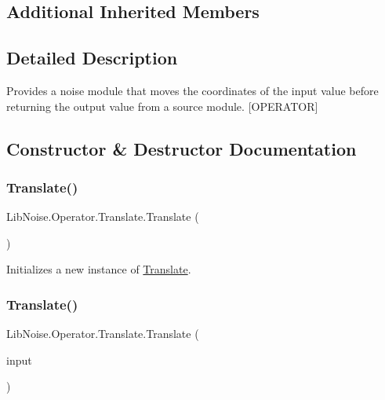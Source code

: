 \subsection*{Additional Inherited Members}


\subsection{Detailed Description}
Provides a noise module that moves the coordinates of the input value before returning the output value from a source module. \mbox{[}O\+P\+E\+R\+A\+T\+OR\mbox{]} 



\subsection{Constructor \& Destructor Documentation}
\mbox{\label{class_lib_noise_1_1_operator_1_1_translate_aaf0a958990e1846f397693b79d7602c6}} 
\subsubsection{\texorpdfstring{Translate()}{Translate()}\hspace{0.1cm}{\footnotesize\ttfamily [1/3]}}
{\footnotesize\ttfamily Lib\+Noise.\+Operator.\+Translate.\+Translate (\begin{DoxyParamCaption}{ }\end{DoxyParamCaption})}



Initializes a new instance of \hyperlink{class_lib_noise_1_1_operator_1_1_translate}{Translate}. 

\mbox{\label{class_lib_noise_1_1_operator_1_1_translate_ae88ec3ed85565ee0f0821de84ea7f44c}} 
\subsubsection{\texorpdfstring{Translate()}{Translate()}\hspace{0.1cm}{\footnotesize\ttfamily [2/3]}}
{\footnotesize\ttfamily Lib\+Noise.\+Operator.\+Translate.\+Translate (\begin{DoxyParamCaption}\item[{\hyperlink{class_lib_noise_1_1_module_base}{Module\+Base}}]{input }\end{DoxyParamCaption})}



